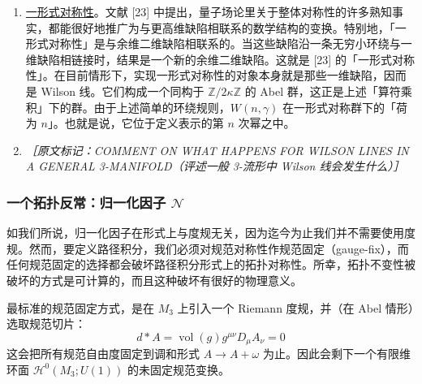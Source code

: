 \begin{enumerate}
  然而，若回想 Chern-Simons 作用量的规范变分 (2.45)，我们就会看到 $M_{\mu}(p)$ 不是规范不变的，而是按
  \begin{equation}
    M_{\mu}(p)\to e^{\mathrm{i}\kappa\mu(\epsilon(p))}M_{\mu}(p)
    \tag{2.280}
    \label{eq:2.280}
  \end{equation}
  变换。因此这个算符不是规范不变的。在一个非拓扑理论中，这个问题可以通过附加一条 Wilson 线、或乘上某个带相反荷的其它带电算符来补救；但在拓扑的 Chern-Simons 理论中，无法引入这些算符。

  {\small\itshape ［原文标记：\ensuremath{\clubsuit} 这里需要解释的东西还很多……\ensuremath{\clubsuit}］}

  \item \underline{一形式对称性}。文献 [23] 中提出，量子场论里关于整体对称性的许多熟知事实，都能很好地推广为与更高维缺陷相联系的数学结构的变换。特别地，「一形式对称性」是与余维二维缺陷相联系的。当这些缺陷沿一条无穷小环绕与一维缺陷相链接时，结果是一个新的余维二维缺陷。这就是 [23] 的「一形式对称性」。在目前情形下，实现一形式对称性的对象本身就是那些一维缺陷，因而是 Wilson 线。它们构成一个同构于 $\mathbb{Z}/2\kappa\mathbb{Z}$ 的 Abel 群，这正是上述「算符乘积」下的群。由于上述简单的环绕规则，$W(n,\gamma)$ 在一形式对称群下的「荷为 $n$」。也就是说，它位于定义表示的第 $n$ 次幂之中。

  \item {\small\itshape ［原文标记：COMMENT ON WHAT HAPPENS FOR WILSON LINES IN A GENERAL 3-MANIFOLD（评述一般 3-流形中 Wilson 线会发生什么）］}
\end{enumerate}

\subsubsection{一个拓扑反常：归一化因子 $\mathcal{N}$} %

如我们所说，归一化因子在形式上与度规无关，因为迄今为止我们并不需要使用度规。然而，要定义路径积分，我们必须对规范对称性作规范固定（gauge-fix），而任何规范固定的选择都会破坏路径积分形式上的拓扑对称性。所幸，拓扑不变性被破坏的方式是可计算的，而且这种破坏有很好的物理意义。

最标准的规范固定方式，是在 $M_3$ 上引入一个 Riemann 度规，并（在 Abel 情形）选取规范切片：
\begin{equation}
  d*A=\operatorname{vol}(g)g^{\mu\nu}D_{\mu}A_{\nu}=0
  \tag{2.281}
  \label{eq:2.281}
\end{equation}
这会把所有规范自由度固定到调和形式 $A\to A+\omega$ 为止。因此会剩下一个有限维环面 $\mathcal{H}^{0}(M_3;U(1))$ 的未固定规范变换。

